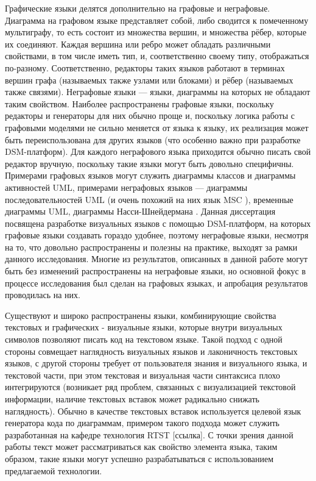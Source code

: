 Графические языки делятся дополнительно на графовые и неграфовые. Диаграмма на 
графовом языке представляет собой, либо сводится к помеченному мультиграфу, то 
есть состоит из множества вершин, и множества рёбер, которые их соединяют. 
Каждая вершина или ребро может обладать различными свойствами, в том числе иметь 
тип, и, соответственно своему типу, отображаться по-разному. Соответственно,
 редакторы таких языков работают в терминах вершин графа (называемых также 
узлами или блоками) и рёбер (называемых также связями). Неграфовые языки --- 
языки, диаграммы на которых не обладают таким свойством. Наиболее распространены 
графовые языки, поскольку редакторы и генераторы для них обычно проще и, 
поскольку логика работы с графовыми моделями не сильно меняется от языка к 
языку, их реализация может быть переиспользована для других языков (что особенно 
важно при разработке DSM-платформ). Для каждого неграфового языка приходится 
обычно писать свой редактор вручную, поскольку такие языки могут быть довольно 
специфичны. Примерами графовых языков могут служить диаграммы классов и 
диаграммы активностей UML, примерами неграфовых языков --- диаграммы 
последовательностей UML (и очень похожий на них язык MSC
), временные диаграммы UML, диаграммы Насси-Шнейдермана
. Данная диссертация посвящена разработке визуальных языков с помощью 
DSM-платформ, на которых графовые языки создавать гораздо удобнее, поэтому 
неграфовые языки, несмотря на то, что довольно распространены и полезны на 
практике, выходят за рамки данного исследования. Многие из результатов, 
описанных в данной работе могут быть без изменений распространены на неграфовые 
языки, но основной фокус в процессе исследования был сделан на графовых языках, 
и апробация результатов проводилась на них.

Существуют и широко распространены языки, комбинирующие свойства текстовых и графических - визуальные языки, которые внутри визуальных символов позволяют писать код на текстовом языке. Такой подход с одной стороны совмещает наглядность визуальных языков и лаконичность текстовых языков, с другой стороны требует от пользователя знания и визуального языка, и текстовой части, при этом текстовая и визуальная части синтаксиса плохо интегрируются (возникает ряд проблем, связанных с визуализацией текстовой информации, наличие текстовых вставок может радикально снижать наглядность). Обычно в качестве текстовых вставок используется целевой язык генератора кода по диаграммам, примером такого подхода может служить разработанная на кафедре технология RTST [ссылка]. С точки зрения данной работы текст может рассматриваться как свойство элемента языка, таким образом, такие языки могут успешно разрабатываться с использованием предлагаемой технологии.

